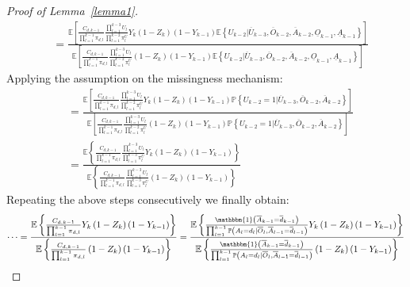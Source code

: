 \documentclass[12pt]{article}
\begin{document}
\begin{proof}[Proof of Lemma~\ref{lemma1}]
\begin{align*}
&= \frac{\mathbb{E} \left[ \frac{C_{d,k-1}}{\prod_{l=1}^{k-1}  \pi_{d,l}} \frac{ \prod_{l=1}^{k-3} U_{l}}{\prod_{l=1}^{k-2}  \pi^U_{l}} Y_{k} \left(1-Z_{k} \right) \left(1-Y_{k-1} \right) \mathbb{E} \left\lbrace U_{k-2} \vert \overline{U}_{k-3}, \overline{O}_{k-2}, \overline{A}_{k-2}, \underline{O}_{k-1}, \underline{A}_{k-1} \right\rbrace \right]}{\mathbb{E} \left[  \frac{C_{d,k-1}}{\prod_{l=1}^{k-1}  \pi_{d,l}} \frac{ \prod_{l=1}^{k-3} U_{l}}{\prod_{l=1}^{k-2}  \pi^U_{l}} \left(1-Z_{k} \right) \left(1-Y_{k-1} \right) \mathbb{E} \left\lbrace U_{k-2} \vert  \overline{U}_{k-3}, \overline{O}_{k-2}, \overline{A}_{k-2}, \underline{O}_{k-1}, \underline{A}_{k-1} \right\rbrace \right]} 
\end{align*}
Applying the assumption on the missingness mechanism:
\begin{align*}
&= \frac{\mathbb{E} \left[ \frac{C_{d,k-1}}{\prod_{l=1}^{k-1}  \pi_{d,l}} \frac{ \prod_{l=1}^{k-3} U_{l}}{\prod_{l=1}^{k-2}  \pi^U_{l}} Y_{k} \left(1-Z_{k} \right) \left(1-Y_{k-1} \right) \mathbb{P} \left\lbrace U_{k-2} = 1 \vert \overline{U}_{k-3}, \overline{O}_{k-2}, \overline{A}_{k-2} \right\rbrace \right]}{\mathbb{E} \left[  \frac{C_{d,k-1}}{\prod_{l=1}^{k-1}  \pi_{d,l}} \frac{ \prod_{l=1}^{k-3} U_{l}}{\prod_{l=1}^{k-2}  \pi^U_{l}} \left(1-Z_{k} \right) \left(1-Y_{k-1} \right) \mathbb{P} \left\lbrace U_{k-2} = 1 \vert  \overline{U}_{k-3}, \overline{O}_{k-2}, \overline{A}_{k-2} \right\rbrace \right]} \\
&= \frac{\mathbb{E} \left\lbrace \frac{C_{d,k-1}}{\prod_{l=1}^{k-1}  \pi_{d,l}} \frac{ \prod_{l=1}^{k-3} U_{l}}{\prod_{l=1}^{k-3}  \pi^U_{l}} Y_{k} \left(1-Z_{k} \right) \left(1-Y_{k-1} \right) \right\rbrace}{\mathbb{E} \left\lbrace  \frac{C_{d,k-1}}{\prod_{l=1}^{k-1}  \pi_{d,l}} \frac{ \prod_{l=1}^{k-3} U_{l}}{\prod_{l=1}^{k-3}  \pi^U_{l}} \left(1-Z_{k} \right) \left(1-Y_{k-1} \right) \right\rbrace} 
\end{align*}
Repeating the above steps consecutively we finally obtain:
\begin{align} \label{eqnB2}
\dots = \frac{\mathbb{E} \left\lbrace \frac{C_{d,k-1}}{\prod_{l=1}^{k-1}  \pi_{d,l}} Y_{k} \left(1-Z_{k} \right) \left(1-Y_{k-1} \right) \right\rbrace}{\mathbb{E} \left\lbrace  \frac{C_{d,k-1}}{\prod_{l=1}^{k-1}  \pi_{d,l}} \left(1-Z_{k} \right) \left(1-Y_{k-1} \right) \right\rbrace} =\frac{\mathbb{E} \left\lbrace \frac{\mathbbm{1} \left( \overline{A}_{k-1} = \overline{d}_{k-1} \right)}{\prod_{l=1}^{k-1} \mathbb{P} \left(A_l = d_l \vert \overline{O}_l, \overline{A}_{l-1} = \overline{d}_{l-1} \right)} Y_{k} \left(1-Z_{k} \right) \left(1-Y_{k-1} \right) \right\rbrace}{\mathbb{E} \left\lbrace \frac{\mathbbm{1} \left( \overline{A}_{k-1} = \overline{d}_{k-1} \right)}{\prod_{l=1}^{k-1} \mathbb{P} \left(A_l = d_l \vert\overline{O}_l, \overline{A}_{l-1} = \overline{d}_{l-1} \right)} \left(1-Z_{k} \right) \left(1-Y_{k-1} \right) \right\rbrace}

\end{align}
\end{proof}
\end{document}

